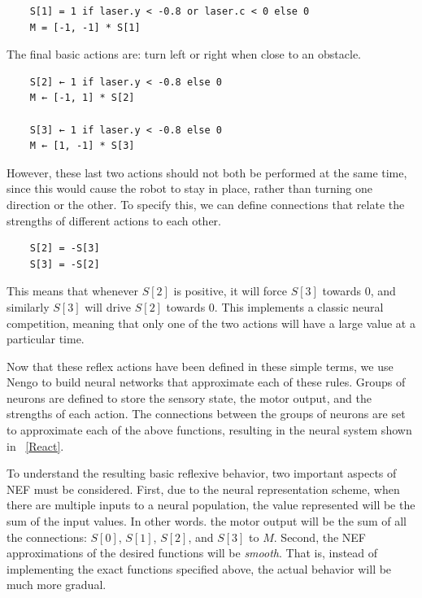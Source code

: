 \documentclass[conference]{IEEEtran}
\begin{document}
\begin{lstlisting}
	S[1] = 1 if laser.y < -0.8 or laser.c < 0 else 0
	M = [-1, -1] * S[1]
\end{lstlisting}

The final basic actions are: turn left or right when close to an obstacle. 

\begin{lstlisting}
	S[2] ← 1 if laser.y < -0.8 else 0
	M ← [-1, 1] * S[2]

	S[3] ← 1 if laser.y < -0.8 else 0
	M ← [1, -1] * S[3]
\end{lstlisting}

However, these last two actions should not both be performed at the same time,
since this would cause the robot to stay in place, rather than turning one
direction or the other. To specify this, we can define connections that relate 
the strengths of different actions to each other.

\begin{lstlisting}
	S[2] = -S[3]
	S[3] = -S[2]
\end{lstlisting}

This means that whenever $S[2]$ is positive, it will force $S[3]$ towards $0$, 
and similarly $S[3]$ will drive $S[2]$ towards $0$.  This implements a classic
neural competition, meaning that only one of the two actions will have a large
value at a particular time.

Now that these reflex actions have been defined in these simple terms, we use
Nengo to build neural networks that approximate each of these rules.  Groups
of neurons are defined to store the sensory state, the motor output, and the 
strengths of each action. The connections between the groups of neurons are 
set to approximate each of the above functions, resulting in the neural 
system shown in \figurename~\ref{React}. 

To understand the resulting basic reflexive behavior,
two important aspects of NEF must be considered. First, due to the neural 
representation scheme, when there are multiple inputs to a neural population, 
the value represented will be the sum of the input values. In other words. the 
motor output will be the sum of all the connections: $S[0]$, $S[1]$, $S[2]$, and $S[3]$ to $M$. 
Second, the NEF approximations of the desired functions will be \textit{smooth}. 
That is, instead of implementing the exact functions specified above, the 
actual behavior will be much more gradual. 
\end{document}
